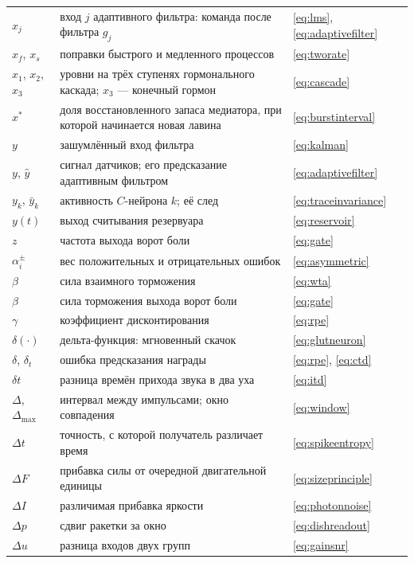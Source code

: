 \begin{center}
\begin{longtable}{>{\raggedright}p{2.0cm}>{\raggedright}p{9.6cm}>{\raggedright\arraybackslash}p{2.4cm}}
$x_j$ & вход $j$ адаптивного фильтра: команда после фильтра $g_j$ & \eqref{eq:lms}, \eqref{eq:adaptivefilter} \\
$x_f$, $x_s$ & поправки быстрого и медленного процессов & \eqref{eq:tworate} \\
$x_1$, $x_2$, $x_3$ & уровни на трёх ступенях гормонального каскада; $x_3$ --- конечный гормон & \eqref{eq:cascade} \\
$x^*$ & доля восстановленного запаса медиатора, при которой начинается новая лавина & \eqref{eq:burstinterval} \\
$y$ & зашумлённый вход фильтра & \eqref{eq:kalman} \\
$y$, $\hat y$ & сигнал датчиков; его предсказание адаптивным фильтром & \eqref{eq:adaptivefilter} \\
$y_k$, $\bar y_k$ & активность $C$-нейрона $k$; её след & \eqref{eq:traceinvariance} \\
$y(t)$ & выход считывания резервуара & \eqref{eq:reservoir} \\
$z$ & частота выхода ворот боли & \eqref{eq:gate} \\
\midrule
$\alpha_i^\pm$ & вес положительных и отрицательных ошибок & \eqref{eq:asymmetric} \\
$\beta$ & сила взаимного торможения & \eqref{eq:wta} \\
$\beta$ & сила торможения выхода ворот боли & \eqref{eq:gate} \\
$\gamma$ & коэффициент дисконтирования & \eqref{eq:rpe} \\
$\delta(\cdot)$ & дельта-функция: мгновенный скачок & \eqref{eq:glutneuron} \\
$\delta$, $\delta_t$ & ошибка предсказания награды & \eqref{eq:rpe}, \eqref{eq:ctd} \\
$\delta t$ & разница времён прихода звука в два уха & \eqref{eq:itd} \\
$\Delta$, $\Delta_{\max}$ & интервал между импульсами; окно совпадения & \eqref{eq:window} \\
$\Delta t$ & точность, с которой получатель различает время & \eqref{eq:spikeentropy} \\
$\Delta F$ & прибавка силы от очередной двигательной единицы & \eqref{eq:sizeprinciple} \\
$\Delta I$ & различимая прибавка яркости & \eqref{eq:photonnoise} \\
$\Delta p$ & сдвиг ракетки за окно & \eqref{eq:dishreadout} \\
$\Delta u$ & разница входов двух групп & \eqref{eq:gainsnr} \\

\end{longtable}
\end{center}
